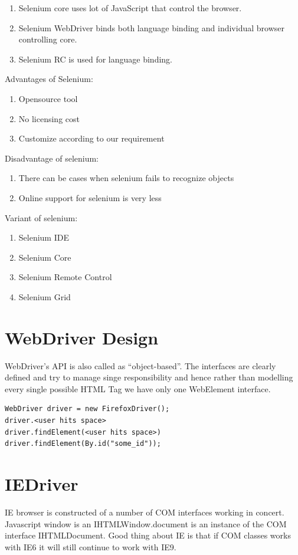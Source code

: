 \documentclass[12pt]{report}
\begin{document}
\begin{enumerate} [label=(\alph*)]
\item Selenium core uses lot of JavaScript that control the browser.
\item Selenium WebDriver binds both language binding and individual browser controlling core.
\item Selenium RC is used for language binding.
\end{enumerate}

Advantages of Selenium:
\begin{enumerate} [label=(\alph*)]
\item Opensource tool
\item No licensing cost
\item Customize according to our requirement
\end{enumerate}

Disadvantage of selenium:
\begin{enumerate} [label=(\alph*)]
\item	There can be cases when selenium fails to recognize objects
\item Online support for selenium is very less
\end{enumerate}

Variant of selenium:
\begin{enumerate} [label=(\alph*)]
\item Selenium IDE
\item Selenium Core
\item Selenium Remote Control
\item Selenium Grid
\end{enumerate}

\section*{WebDriver Design}
WebDriver’s API is also called as  “object-based”. The interfaces are clearly defined and try to manage singe responsibility and hence rather than modelling every single possible HTML Tag we have only one WebElement interface.

\begin{verbatim}
WebDriver driver = new FirefoxDriver();
driver.<user hits space>
driver.findElement(<user hits space>)
driver.findElement(By.id("some_id"));
\end{verbatim}

\section*{IEDriver}
IE browser is constructed of a number of COM interfaces working in concert. Javascript window is an IHTMLWindow.document is an instance of the COM interface  IHTMLDocument. Good thing about IE is that if COM classes works with IE6 it will still continue to work with IE9.
\end{document}
